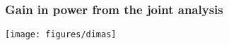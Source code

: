 \documentclass[ignorenonframetext]{beamer}
\begin{document}
\begin{frame}
\frametitle{Gain in power from the joint analysis}
\begin{center}
\texttt{[image: figures/dimas]}%
\end{center}
\end{frame}
\end{document}
